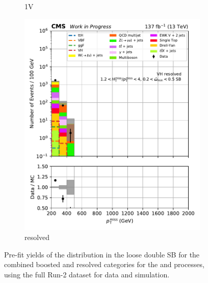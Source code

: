 \begin{figure}[htbp]
\begin{subfigure}[b]{0.24\textwidth}
        \caption{\VH 1V}
    \end{subfigure}
    \hfill
    \begin{subfigure}[b]{0.24\textwidth}
        \includegraphics[width=\textwidth]{figures/region_plots/full_Run2/sideband_1/VH_resolved.pdf}
        \caption{\VH resolved}
    \end{subfigure}
    \caption[Pre-fit yields of the \ptmiss distribution in the loose double sideband for the combined boosted and resolved categories for the \ttH and \VH processes, using the full Run-2 dataset for data and simulation]{Pre-fit yields of the \ptmiss distribution in the loose double \gls{SB} for the combined boosted and resolved categories for the \ttH and \VH processes, using the full Run-2 dataset for data and simulation.}
    \label{fig:htoinv_sb_yields_comb2016to18_loose_double}
\end{figure}
